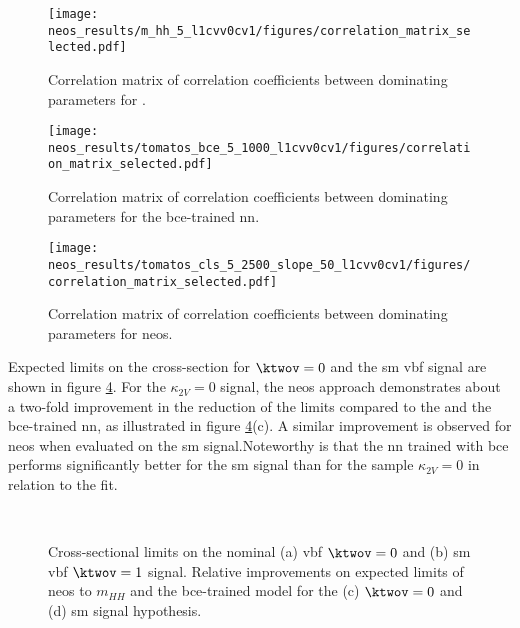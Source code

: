 \begin{figure}
    \centering
    \texttt{[image: neos\_results/m\_hh\_5\_l1cvv0cv1/figures/correlation\_matrix\_selected.pdf]}
    \caption[]{Correlation matrix of correlation coefficients between dominating parameters for \mhh.}
    \label{fig:correlation_matrix_m_hh}
\end{figure}
\begin{figure}
    \centering
    \texttt{[image: neos\_results/tomatos\_bce\_5\_1000\_l1cvv0cv1/figures/correlation\_matrix\_selected.pdf]}
    \caption[]{Correlation matrix of correlation coefficients between dominating parameters for the \ac{bce}-trained \ac{nn}.}
    \label{fig:correlation_matrix_bce}
\end{figure}
\begin{figure}
    \centering
    \texttt{[image: neos\_results/tomatos\_cls\_5\_2500\_slope\_50\_l1cvv0cv1/figures/correlation\_matrix\_selected.pdf]}
    \caption[]{Correlation matrix of correlation coefficients between dominating parameters for \ac{neos}.}
    \label{fig:correlation_matrix_cls}
\end{figure}

Expected limits on the cross-section for $\ktwov=0$ and the \ac{sm} \ac{vbf} signal are shown in figure \ref{fig:neos_valid_brazil_limits}.  For the $\kappa_{2V} = 0$ signal, the \ac{neos} approach demonstrates about a two-fold improvement in the reduction of the limits compared to the \mhh and the \ac{bce}-trained \ac{nn}, as illustrated in figure \ref{fig:neos_valid_brazil_limits}(c). A similar improvement is observed for \ac{neos} when evaluated on the \ac{sm} signal.Noteworthy is that the \ac{nn} trained with \ac{bce} performs significantly better for the \ac{sm} signal than for the sample $\kappa_{2V} = 0$ in relation to the \mhh fit.

\begin{figure}
    \centering
    \\
    \caption[]{Cross-sectional limits on the nominal (a) \ac{vbf} $\ktwov=0$ and (b) \ac{sm} \ac{vbf} $\ktwov=1$ signal. Relative improvements on expected limits of \ac{neos} to $m_{HH}$ and the \ac{bce}-trained model for the (c) $\ktwov=0$ and (d) \ac{sm} signal hypothesis.}
    \label{fig:neos_valid_brazil_limits}
\end{figure}

